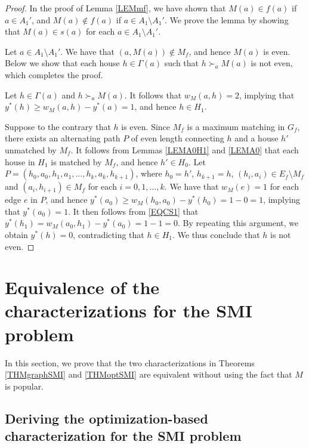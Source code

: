 \documentclass[11pt,a4paper,showkeys]{article}
\theoremstyle{plain}
\theoremstyle{definition}
\begin{document}
\begin{proof}
    In the proof of Lemma \ref{LEMmf}, 
    we have shown that $M(a)\in f(a)$ if $a\in A_1'$, 
    and 
    $M(a)\not\in f(a)$ if $a\in A_1 \setminus A_1'$. 
    We prove the lemma by showing that $M(a)\in s(a)$ for each $a\in A_1 \setminus A_1'$. 

    Let $a\in A_1 \setminus A_1'$. 
    We have that $(a,M(a)) \not \in M_f$, 
    and hence $M(a)$ is even. 
    Below we show that each house $h\in \Gamma(a)$ such that $h\succ_a M(a)$ is not even, 
    which completes the proof. 

    Let $h\in \Gamma(a)$ and $h\succ_a M(a)$. 
    It follows that $w_M(a,h)=2$, 
    implying that $y^*(h)\ge w_M(a,h) - y^*(a)=1$, and hence $h\in H_1$. 
    
    Suppose to the contrary that $h$ is even. 
    Since $M_f$ is a maximum matching in $G_f$, 
    there exists an alternating path $P$ of even length connecting $h$ and a house $h'$ unmatched by $M_f$. 
    It follows from Lemmas \ref{LEMA0H1} and \ref{LEMA0} that each house in $H_1$ is matched by $M_f$, 
    and hence $h'\in H_0$. 
    Let $P=(h_0,a_0,h_1,a_1,\ldots, h_{k},a_k,h_{k+1})$, 
    where 
    $h_0=h'$, $h_{k+1}=h$, 
    $(h_i,a_i)\in E_f \setminus M_f$ 
    and 
    $(a_i,h_{i+1})\in M_f$ for each $i=0,1,\ldots, k$. 
    We have that $w_M(e)=1$ for each edge $e$ in $P$, 
    and hence $y^*(a_0) \ge w_M(h_0,a_0) - y^*(h_0)=1-0=1$, 
    implying that $y^*(a_0)=1$. 
    It then follows from \eqref{EQCS1} that 
    $y^*(h_1)=w_M(a_0,h_1)-y^*(a_0)=1-1=0$. 
    By repeating this argument, 
    we obtain $y^*(h)=0$, 
    contradicting that $h\in H_1$.    
    We thus conclude that $h$ is not even. 
\end{proof}


\section{Equivalence of the characterizations for the SMI problem}
\label{SECSMI}
In this section, 
we prove that the two characterizations in Theorems \ref{THMgraphSMI} and \ref{THMoptSMI} are equivalent 
without using the fact that $M$ is popular. 


\subsection{Deriving the optimization-based characterization for the SMI problem}
\end{document}
